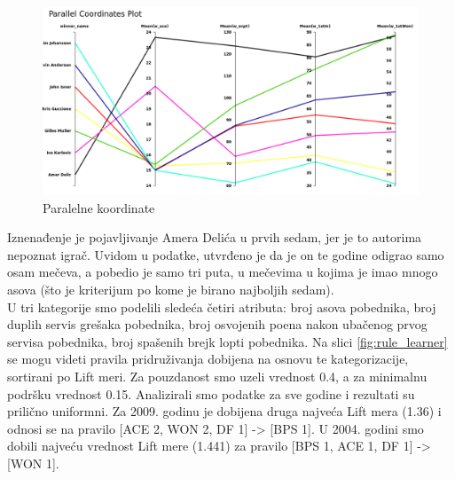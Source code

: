 \documentclass[a4paper]{article}
\begin{document}
\begin{figure}[H]
	\begin{center}
		\includegraphics[width=1\textwidth]{PravilaPridruzivanja/parallel2009}
	\end{center}
	\caption{Paralelne koordinate}
	\label{fig:parallel}
\end{figure}

Iznenađenje je pojavljivanje Amera Delića u prvih sedam, jer je to
autorima nepoznat igrač. Uvidom u podatke, utvrđeno je da je on te godine odigrao samo osam mečeva,
a pobedio je samo tri puta, u mečevima u kojima je imao mnogo asova (što je kriterijum po kome je birano najboljih sedam). \\

U tri kategorije smo podelili sledeća četiri atributa: broj asova pobednika, broj duplih servis grešaka pobednika,
broj osvojenih poena nakon ubačenog prvog servisa pobednika, broj spašenih brejk lopti pobednika.
Na slici \ref{fig:rule_learner} se mogu videti pravila pridruživanja dobijena na osnovu te kategorizacije,
sortirani po Lift meri. Za pouzdanost smo uzeli vrednost 0.4, a za minimalnu podršku vrednost 0.15.
Analizirali smo podatke za sve godine i rezultati su prilično uniformni. Za 2009. godinu je dobijena druga najveća
Lift mera (1.36) i odnosi se na pravilo [ACE 2, WON 2, DF 1] -> [BPS 1].
U 2004. godini smo dobili najveću vrednost Lift mere (1.441) za pravilo [BPS 1, ACE 1, DF 1] -> [WON 1].
\end{document}
